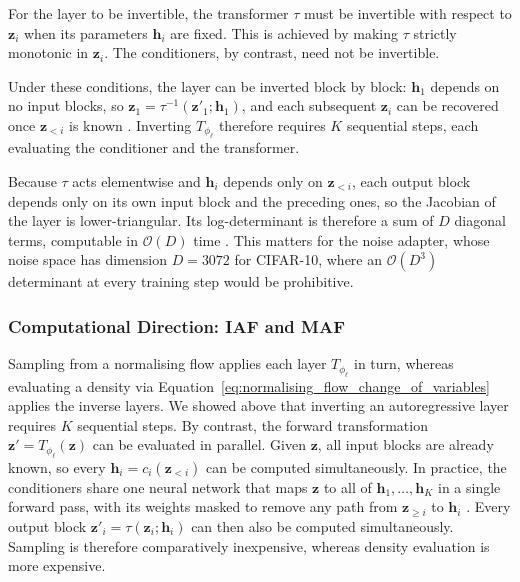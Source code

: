 \documentclass[12pt,a4paper]{report}
\begin{document}
For the layer to be invertible, the transformer $\tau$ must be invertible with respect to $\mathbf{z}_i$ when its parameters $\mathbf{h}_i$ are fixed. This is achieved by making $\tau$ strictly monotonic in $\mathbf{z}_i$. The conditioners, by contrast, need not be invertible.

Under these conditions, the layer can be inverted block by block: $\mathbf{h}_1$ depends on no input blocks, so $\mathbf{z}_1=\tau^{-1}(\mathbf{z}'_1;\mathbf{h}_1)$, and each subsequent $\mathbf{z}_i$ can be recovered once $\mathbf{z}_{<i}$ is known \parencite{NF_survey}. Inverting $T_{\phi_\ell}$ therefore requires $K$ sequential steps, each evaluating the conditioner and the transformer.

Because $\tau$ acts elementwise and $\mathbf{h}_i$ depends only on $\mathbf{z}_{<i}$, each output block depends only on its own input block and the preceding ones, so the Jacobian of the layer is lower-triangular. Its log-determinant is therefore a sum of $D$ diagonal terms, computable in $\mathcal{O}(D)$ time \parencite{NF_survey}. This matters for the noise adapter, whose noise space has dimension $D=3072$ for CIFAR-10, where an $\mathcal{O}(D^3)$ determinant at every training step would be prohibitive.

\subsubsection{Computational Direction: IAF and MAF}
\label{subsubsec:computational_direction_iaf_and_maf}
Sampling from a normalising flow applies each layer $T_{\phi_\ell}$ in turn, whereas evaluating a density via Equation~\ref{eq:normalising_flow_change_of_variables} applies the inverse layers. We showed above that inverting an autoregressive layer requires $K$ sequential steps. By contrast, the forward transformation $\mathbf{z}'=T_{\phi_\ell}(\mathbf{z})$ can be evaluated in parallel. Given $\mathbf{z}$, all input blocks are already known, so every $\mathbf{h}_i=c_i(\mathbf{z}_{<i})$ can be computed simultaneously. In practice, the conditioners share one neural network that maps $\mathbf{z}$ to all of $\mathbf{h}_1,\ldots,\mathbf{h}_K$ in a single forward pass, with its weights masked to remove any path from $\mathbf{z}_{\geq i}$ to $\mathbf{h}_i$ \parencite{germain2015mademaskedautoencoderdistribution,NF_survey}. Every output block $\mathbf{z}'_i=\tau(\mathbf{z}_i;\mathbf{h}_i)$ can then also be computed simultaneously. Sampling is therefore comparatively inexpensive, whereas density evaluation is more expensive.
\end{document}
